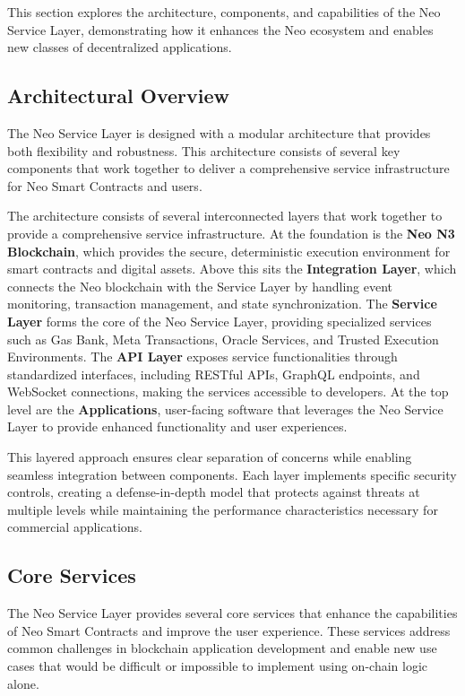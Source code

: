 \documentclass[12pt,a4paper]{article}
\begin{document}
This section explores the architecture, components, and capabilities of the Neo Service Layer, demonstrating how it enhances the Neo ecosystem and enables new classes of decentralized applications.

\subsection{Architectural Overview}
\label{subsec:nsl-architecture}

The Neo Service Layer is designed with a modular architecture that provides both flexibility and robustness. This architecture consists of several key components that work together to deliver a comprehensive service infrastructure for Neo Smart Contracts and users.



The architecture consists of several interconnected layers that work together to provide a comprehensive service infrastructure. At the foundation is the \textbf{Neo N3 Blockchain}, which provides the secure, deterministic execution environment for smart contracts and digital assets. Above this sits the \textbf{Integration Layer}, which connects the Neo blockchain with the Service Layer by handling event monitoring, transaction management, and state synchronization. The \textbf{Service Layer} forms the core of the Neo Service Layer, providing specialized services such as Gas Bank, Meta Transactions, Oracle Services, and Trusted Execution Environments. The \textbf{API Layer} exposes service functionalities through standardized interfaces, including RESTful APIs, GraphQL endpoints, and WebSocket connections, making the services accessible to developers. At the top level are the \textbf{Applications}, user-facing software that leverages the Neo Service Layer to provide enhanced functionality and user experiences.

This layered approach ensures clear separation of concerns while enabling seamless integration between components. Each layer implements specific security controls, creating a defense-in-depth model that protects against threats at multiple levels while maintaining the performance characteristics necessary for commercial applications.

\subsection{Core Services}
\label{subsec:nsl-core-services}

The Neo Service Layer provides several core services that enhance the capabilities of Neo Smart Contracts and improve the user experience. These services address common challenges in blockchain application development and enable new use cases that would be difficult or impossible to implement using on-chain logic alone.
\end{document}
